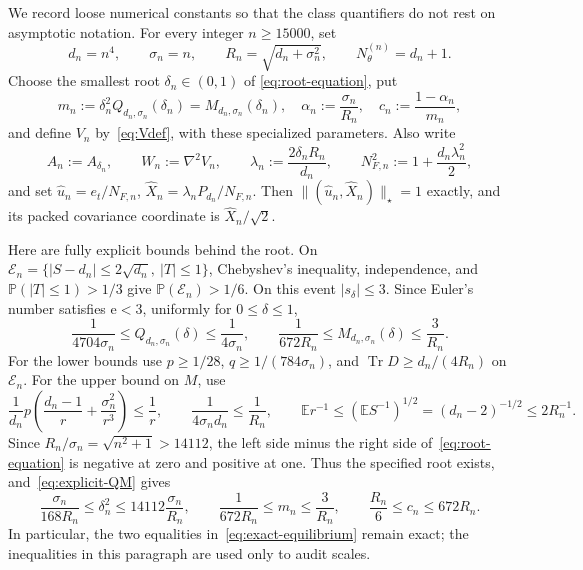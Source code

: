 \documentclass[11pt]{article}
\numberwithin{equation}{section}
\DeclareMathOperator{\Tr}{Tr}
\newcommand{\E}{\mathbb E}
\begin{document}
We record loose numerical constants so that the class quantifiers do not rest
on asymptotic notation.  For every integer $n\ge15000$, set
\begin{equation}\label{eq:explicit-slice}
 d_n=n^4,\qquad \sigma_n=n,\qquad
 R_n=\sqrt{d_n+\sigma_n^2},\qquad N_\theta^{(n)}=d_n+1.
\end{equation}
Choose the smallest root $\delta_n\in(0,1)$ of
\eqref{eq:root-equation}, put
\[
 m_n:=\delta_n^2Q_{d_n,\sigma_n}(\delta_n)
     =M_{d_n,\sigma_n}(\delta_n),\quad
 \alpha_n:=\frac{\sigma_n}{R_n},\quad
 c_n:=\frac{1-\alpha_n}{m_n},
\]
and define $V_n$ by~\eqref{eq:Vdef}, with these specialized parameters.
Also write
\begin{equation}\label{eq:explicit-specialized-notation}
 A_n:=A_{\delta_n},\qquad W_n:=\nabla^2V_n,\qquad
 \lambda_n:=\frac{2\delta_nR_n}{d_n},\qquad
 N_{F,n}^2:=1+\frac{d_n\lambda_n^2}{2},
\end{equation}
and set
$\widehat u_n=e_t/N_{F,n}$,
$\widehat X_n=\lambda_nP_{d_n}/N_{F,n}$.
Then $\|(\widehat u_n,\widehat X_n)\|_\star=1$ exactly, and its packed
covariance coordinate is $\widehat X_n/\sqrt2$.

Here are fully explicit bounds behind the root.  On
$\mathcal E_n=\{|S-d_n|\le2\sqrt{d_n},\ |T|\le1\}$, Chebyshev's inequality,
independence, and $\mathbb P(|T|\le1)>1/3$ give
$\mathbb P(\mathcal E_n)>1/6$.  On this event $|s_\delta|\le3$.  Since
Euler's number satisfies $\mathrm e<3$, uniformly for $0\le\delta\le1$,
\begin{equation}\label{eq:explicit-QM}
 \frac1{4704\sigma_n}\le Q_{d_n,\sigma_n}(\delta)
 \le\frac1{4\sigma_n},\qquad
 \frac1{672R_n}\le M_{d_n,\sigma_n}(\delta)
 \le\frac3{R_n}.
\end{equation}
For the lower bounds use $p\ge1/28$, $q\ge1/(784\sigma_n)$, and
$\Tr D\ge d_n/(4R_n)$ on $\mathcal E_n$.  For the upper bound on $M$, use
\[
 \frac1{d_n}p\left(\frac{d_n-1}{r}
 +\frac{\sigma_n^2}{r^3}\right)\le\frac1r,\qquad
 \frac1{4\sigma_nd_n}\le\frac1{R_n},\qquad
 \E r^{-1}\le(\E S^{-1})^{1/2}
 =(d_n-2)^{-1/2}\le2R_n^{-1}.
\]
Since $R_n/\sigma_n=\sqrt{n^2+1}>14112$, the left side minus the right
side of~\eqref{eq:root-equation} is negative at zero and positive at one.
Thus the specified root exists, and~\eqref{eq:explicit-QM} gives
\begin{equation}\label{eq:explicit-root-bounds}
 \frac{\sigma_n}{168R_n}\le\delta_n^2
 \le14112\frac{\sigma_n}{R_n},\qquad
 \frac1{672R_n}\le m_n\le\frac3{R_n},\qquad
 \frac{R_n}{6}\le c_n\le672R_n.
\end{equation}
In particular, the two equalities in~\eqref{eq:exact-equilibrium} remain
exact; the inequalities in this paragraph are used only to audit scales.
\end{document}
